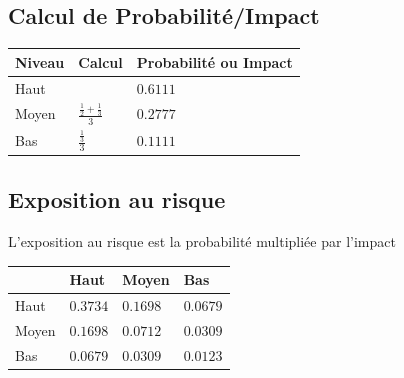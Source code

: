 \subsection{Calcul de Probabilité/Impact}

\begin{table}[H]
  \begin{center}
    \begin{tabu} to 0.5\linewidth {X[m]X[c,m]X[r,m]}
      \textbf{Niveau} & \textbf{Calcul} & \textbf{Probabilité ou Impact} \\
      \hline
      Haut  &  & $0.6111$\\
      Moyen & $\frac{\frac{1}{2} +\frac{1}{3}}{3}$                  & $0.2777$\\
      Bas   & $\frac{\frac{1}{3}}{3}$                               & $0.1111$\\
    \end{tabu}
  \end{center}
\end{table}

\subsection{Exposition au risque}
L'exposition au risque est la probabilité multipliée par l'impact

\begin{table}[H]
  \begin{center}
    \begin{tabu} to 0.7\linewidth {X[1]|X[1]|X[1]|X[1]}
      & \textbf{Haut}     & \textbf{Moyen}    & \textbf{Bas} \\
      \hline
      Haut    & $0.3734$ & $0.1698$ & $0.0679$\\
      \hline
      Moyen   & $0.1698$ & $0.0712$ & $0.0309$\\
      \hline
      Bas     & $0.0679$ & $0.0309$ & $0.0123$\\
    \end{tabu}
  \end{center}
\end{table}
